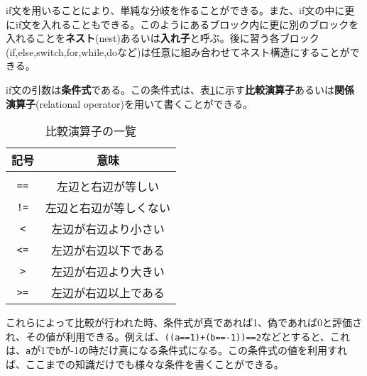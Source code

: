 if文を用いることにより、単純な分岐を作ることができる。また、if文の中に更にif文を入れることもできる。このようにあるブロック内に更に別のブロックを入れることを\textbf{ネスト}(nest)あるいは\textbf{入れ子}と呼ぶ。後に習う各ブロック(if,else,switch,for,while,doなど)は任意に組み合わせてネスト構造にすることができる。

if文の引数は\textbf{条件式}である。この条件式は、表\ref{relational_ope}に示す\textbf{比較演算子}あるいは\textbf{関係演算子}(relational operator)を用いて書くことができる。
\begin{table}[htb]
\centering
\caption{比較演算子の一覧}\label{relational_ope}
\begin{tabular}{|c|c|}\hline
記号&意味\\ \hline
& \\[-15.5pt] \hline
\verb|==| & 左辺と右辺が等しい\\ \hline
\verb|!=| & 左辺と右辺が等しくない\\ \hline
\verb|<| & 左辺が右辺より小さい\\ \hline
\verb|<=| & 左辺が右辺以下である\\ \hline
\verb|>| & 左辺が右辺より大きい\\ \hline
\verb|>=| & 左辺が右辺以上である\\ \hline
\end{tabular}
\end{table}

これらによって比較が行われた時、条件式が真であれば1、偽であれば0と評価され、その値が利用できる。例えば、\verb|((a==1)+(b==-1))==2|などとすると、これは、\verb|a|が1で\verb|b|が-1の時だけ真になる条件式になる。この条件式の値を利用すれば、ここまでの知識だけでも様々な条件を書くことができる。

